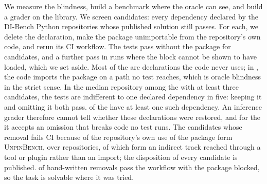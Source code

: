 \documentclass[11pt]{article}
\newcommand{\bench}{\textsc{UnpinBench}}
\newcommand{\dibench}{DI-Bench}
\begin{document}
We measure the blindness, build a benchmark where the oracle can see, and build a grader on the library.
We screen \nCand{} candidates: every dependency declared by the \nRepos{} \dibench{} Python repositories whose published solution still passes.
For each, we delete the declaration, make the package unimportable from the repository's own code, and rerun its CI workflow.
The tests pass without the package for \nSilent{} candidates, and a further \nExclInconclusive{} pass in runs where the block cannot be shown to have loaded, which we set aside.
Most of the \nSilent{} are declarations the code never uses; in \nStrict, the code imports the package on a path no test reaches, which is oracle blindness in the strict sense.
In the median repository among the \nReposThree{} with at least three candidates, the tests are indifferent to one declared dependency in five: keeping it and omitting it both pass.
\nIncidence{} of the \nReposThree{} have at least one such dependency.
An inference grader therefore cannot tell whether these declarations were restored, and for the \nStrict{} it accepts an omission that breaks code no test runs.
The \nPairs{} candidates whose removal fails CI because of the repository's own use of the package form \bench, over \nPoolRepos{} repositories, of which \nTierIndirect{} form an indirect track reached through a tool or plugin rather than an import; the disposition of every candidate is published.
\nRefsPass{} of \nRefs{} hand-written removals pass the workflow with the package blocked, so the task is solvable where it was tried.
\end{document}
